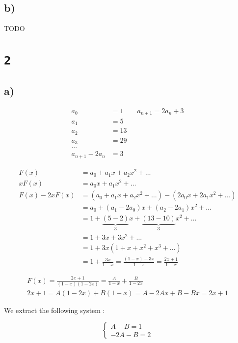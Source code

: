 \documentclass[a4paper,11pt]{report}
\begin{document}
\subsection*{b)}

TODO

\section*{\texttt{2}}

\subsection*{a)}

\begin{align*}
  a_0 &= 1 \qquad a_{n+1} = 2 a_n + 3 \\
  a_1 &= 5 \\
  a_2 &= 13 \\
  a_3 &= 29 \\
  \dots \\
  a_{n+1} - 2a_n &= 3
\end{align*}

\begin{align*}
  F(x) &= a_0 + a_1 x + a_2 x^2 + \dots \\
  x F(x) &=     a_0 x + a_1x^2 + \dots \\
  F(x) - 2 x F(x) &= (a_0 + a_1 x + a_2 x^2 + \dots ) - (2 a_0 x + 2 a_1 x^2 + \dots) \\
       &= a_0 + (a_1 - 2 a_0) x + (a_2 - 2 a_1) x^2 + \dots \\
       &= 1 + \underbrace{(5-2)}_3 x + \underbrace{(13-10)}_3 x^2 + \dots \\
       &= 1 + 3x + 3x^2 + \dots \\
       &= 1 + 3x(1 + x + x^2 + x^3 + \dots) \\
       &= 1 + \frac{3x}{1-x} = \frac{(1-x) + 3x}{1-x} = \frac{2x+1}{1-x}
\end{align*}

\begin{align*}
  F(x) = \frac{2x+1}{(1-x)(1-2x)} = \frac{A}{1-x} + \frac{B}{1-2x} \\
  2x + 1 = A(1-2x) + B(1-x) = A - 2Ax + B - Bx = 2x + 1
\end{align*}

We extract the following system :

\[
  \begin{cases}
    A + B = 1 \\
    -2 A - B = 2
  \end{cases}
\]
\end{document}
